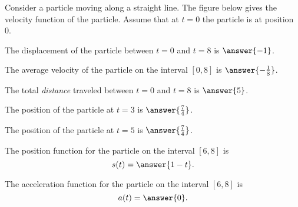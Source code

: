 \documentclass{ximera}
\author{Nela Lakos \and Kyle Parsons}
\begin{document}
\begin{exercise}

Consider a particle moving along a straight line.  The figure below gives the velocity function of the particle.  Assume that at $t=0$ the particle is at position 0.

\begin{image}
\end{image}

The displacement of the particle between $t=0$ and $t=8$ is $\answer{-1}$.

The average velocity of the particle on the interval $[0,8]$ is $\answer{-\frac{1}{8}}$.

The total \emph{distance} traveled between $t=0$ and $t=8$ is $\answer{5}$.

The position of the particle at $t=3$ is $\answer{\frac{7}{4}}$.

The position of the particle at $t=5$ is $\answer{\frac{7}{4}}$.

The position function for the particle on the interval $[6,8]$ is
\[
s(t) = \answer{1-t}.
\]

The acceleration function for the particle on the interval $[6,8]$ is
\[
a(t) = \answer{0}.
\]

\end{exercise}
\end{document}
